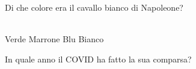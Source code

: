 \documentclass[a4paper,11pt]{exam}
\begin{document}
\begin{questions}
    
\question Di che colore era il cavallo bianco di Napoleone?\\\
\begin{oneparchoices}
  \choice Verde
  \choice Marrone
  \choice Blu 
  \choice Bianco
\end{oneparchoices}

    
\question In quale anno il COVID ha fatto la sua comparsa?\\\
\begin{oneparchoices}
  \choice 2020
\end{oneparchoices}

    
\end{questions}

    
    \newpage
    
    
\end{document}
